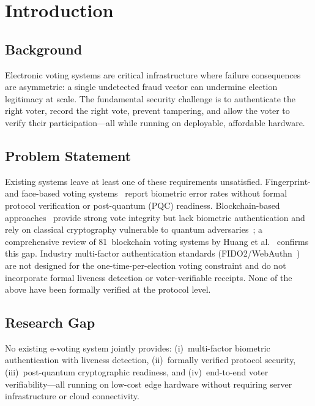 \documentclass[preprint,12pt]{elsarticle}
\begin{document}
\section{Introduction}
\label{sec:intro}

\subsection{Background}

Electronic voting systems are critical infrastructure where failure
consequences are asymmetric: a single undetected fraud vector can
undermine election legitimacy at scale. The fundamental security challenge
is to authenticate the right voter, record the right vote, prevent
tampering, and allow the voter to verify their participation—all while
running on deployable, affordable hardware.

\subsection{Problem Statement}

Existing systems leave at least one of these requirements unsatisfied.
Fingerprint- and face-based voting systems~\cite{bello2021biometric,
sanchez2020biometric,komatineni2020biometric,nagaraj2022voting} report
biometric error rates without formal protocol verification or post-quantum
(PQC) readiness. Blockchain-based approaches~\cite{ayed2017conceptual,
hardwick2018voting,faruk2024transforming} provide strong vote integrity
but lack biometric authentication and rely on classical cryptography
vulnerable to quantum adversaries~\cite{bernstein2017post}; a
comprehensive review of 81~blockchain voting systems by Huang et
al.~\cite{huang2022blockchain_voting} confirms this gap.
Industry multi-factor authentication standards
(FIDO2/WebAuthn~\cite{fido2_webauthn}) are not designed for the
one-time-per-election voting constraint and do not incorporate formal
liveness detection or voter-verifiable receipts.
None of the above have been formally verified at the protocol level.

\subsection{Research Gap}

No existing e-voting system jointly provides: (i)~multi-factor biometric
authentication with liveness detection, (ii)~formally verified protocol
security, (iii)~post-quantum cryptographic readiness, and (iv)~end-to-end
voter verifiability—all running on low-cost edge hardware without
requiring server infrastructure or cloud connectivity.
\end{document}
